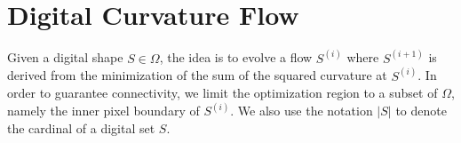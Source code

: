 \documentclass[smallextended]{svjour3}       %
\begin{document}
\section{Digital Curvature Flow}

%	
%
%		
%
%
%

%





Given a digital shape $S \in \Omega$, the idea is to evolve a flow $S^{(i)}$ where $S^{(i+1)}$ is derived from the minimization of the sum of the squared curvature at $S^{(i)}$. In order to guarantee connectivity, we limit the optimization region to a subset of $\Omega$, namely the inner pixel boundary of  $S^{(i)}$. We also use the notation $| S |$ to denote the cardinal of a digital set $S$.
\end{document}
